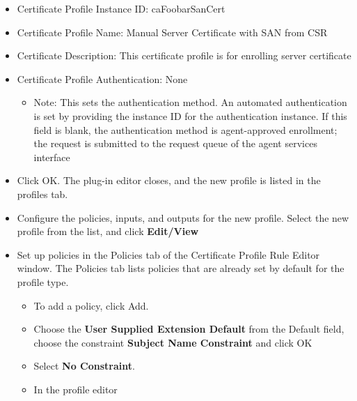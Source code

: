 \documentclass[a4paper]{article}
\begin{document}
\begin{enumerate}[label*=\arabic*.]
\begin{enumerate}[label*=\arabic*.]
                    \begin{itemize}
                        \item Certificate Profile Instance ID: caFoobarSanCert
                        \item Certificate Profile Name: Manual Server Certificate with SAN from CSR
                        \item Certificate Description: This certificate profile is for enrolling server certificate
                        \item Certificate Profile Authentication: None 
                            \begin{itemize}
                                \item Note: This sets the authentication method. An automated authentication is set by providing the 
                                instance ID for the authentication instance. If this field is blank, the authentication method 
                                is agent-approved enrollment; the request is submitted to the request queue of the agent services 
                                interface
                            \end{itemize}
                        \item Click OK. The plug-in editor closes, and the new profile is listed in the profiles tab.
                        \item Configure the policies, inputs, and outputs for the new profile. Select the new profile from the list,
                            and click \textbf{Edit/View}
                        \item Set up policies in the Policies tab of the Certificate Profile Rule Editor window.
                            The Policies tab lists policies that are already set by default for the profile type.
                                \begin{itemize}
                                    \item To add a policy, click Add.
                                    \item Choose the \textbf{User Supplied Extension Default}  from the Default field, 
                                        choose the constraint \textbf{Subject Name Constraint} and click OK
                                    \item Select \textbf{No Constraint}.
                                    \item In the profile editor 
                                        \begin{itemize}

\end{itemize}
\end{itemize}
\end{itemize}
\end{enumerate}
\end{enumerate}
\end{document}
